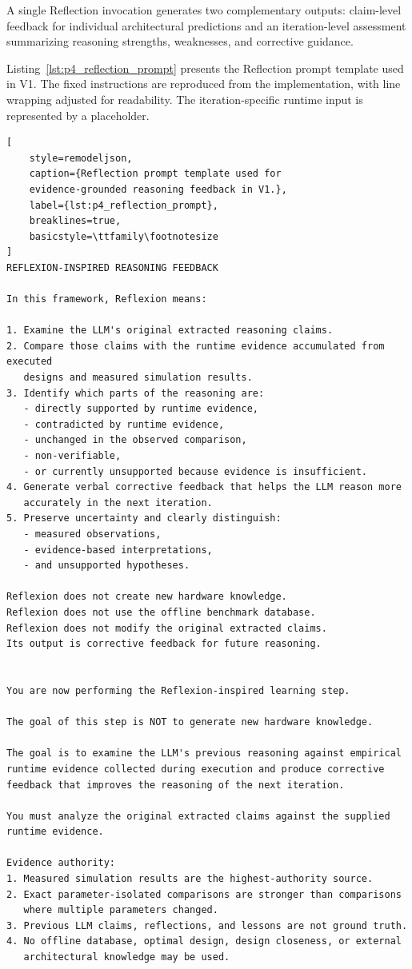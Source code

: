 A single Reflection invocation generates two
complementary outputs: claim-level feedback for
individual architectural predictions and an
iteration-level assessment summarizing reasoning
strengths, weaknesses, and corrective guidance.

Listing~\ref{lst:p4_reflection_prompt} presents the
Reflection prompt template used in V1. The fixed
instructions are reproduced from the implementation,
with line wrapping adjusted for readability. The
iteration-specific runtime input is represented by
a placeholder.

\begin{lstlisting}[
    style=remodeljson,
    caption={Reflection prompt template used for
    evidence-grounded reasoning feedback in V1.},
    label={lst:p4_reflection_prompt},
    breaklines=true,
    basicstyle=\ttfamily\footnotesize
]
REFLEXION-INSPIRED REASONING FEEDBACK

In this framework, Reflexion means:

1. Examine the LLM's original extracted reasoning claims.
2. Compare those claims with the runtime evidence accumulated from executed
   designs and measured simulation results.
3. Identify which parts of the reasoning are:
   - directly supported by runtime evidence,
   - contradicted by runtime evidence,
   - unchanged in the observed comparison,
   - non-verifiable,
   - or currently unsupported because evidence is insufficient.
4. Generate verbal corrective feedback that helps the LLM reason more
   accurately in the next iteration.
5. Preserve uncertainty and clearly distinguish:
   - measured observations,
   - evidence-based interpretations,
   - and unsupported hypotheses.

Reflexion does not create new hardware knowledge.
Reflexion does not use the offline benchmark database.
Reflexion does not modify the original extracted claims.
Its output is corrective feedback for future reasoning.


You are now performing the Reflexion-inspired learning step.

The goal of this step is NOT to generate new hardware knowledge.

The goal is to examine the LLM's previous reasoning against empirical
runtime evidence collected during execution and produce corrective
feedback that improves the reasoning of the next iteration.

You must analyze the original extracted claims against the supplied
runtime evidence.

Evidence authority:
1. Measured simulation results are the highest-authority source.
2. Exact parameter-isolated comparisons are stronger than comparisons
   where multiple parameters changed.
3. Previous LLM claims, reflections, and lessons are not ground truth.
4. No offline database, optimal design, design closeness, or external
   architectural knowledge may be used.


\end{lstlisting}
